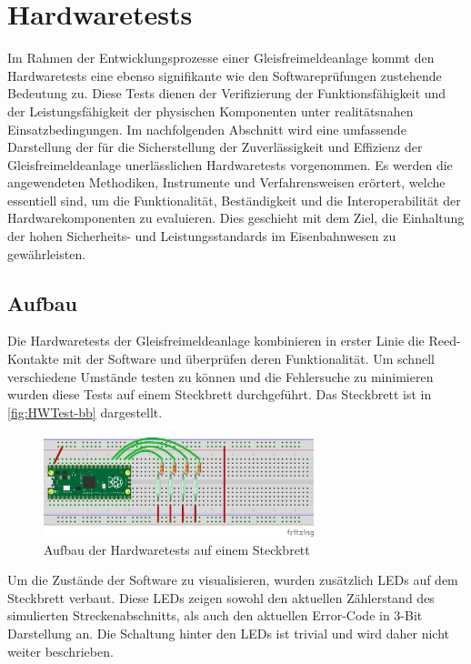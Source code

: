 \section{Hardwaretests}\label{text:Entwicklung-der-GFA:Hardwaretests}

Im Rahmen der Entwicklungsprozesse einer Gleisfreimeldeanlage kommt den Hardwaretests eine ebenso signifikante wie den Softwareprüfungen zustehende Bedeutung zu. Diese Tests dienen der Verifizierung der Funktionsfähigkeit und der Leistungsfähigkeit der physischen Komponenten unter realitätsnahen Einsatzbedingungen. Im nachfolgenden Abschnitt wird eine umfassende Darstellung der für die Sicherstellung der Zuverlässigkeit und Effizienz der Gleisfreimeldeanlage unerlässlichen Hardwaretests vorgenommen. Es werden die angewendeten Methodiken, Instrumente und Verfahrensweisen erörtert, welche essentiell sind, um die Funktionalität, Beständigkeit und die Interoperabilität der Hardwarekomponenten zu evaluieren. Dies geschieht mit dem Ziel, die Einhaltung der hohen Sicherheits- und Leistungsstandards im Eisenbahnwesen zu gewährleisten.

\subsection{Aufbau}

Die Hardwaretests der Gleisfreimeldeanlage kombinieren in erster Linie die Reed-Kontakte mit der Software und überprüfen deren Funktionalität. Um schnell verschiedene Umstände testen zu können und die Fehlersuche zu minimieren wurden diese Tests auf einem Steckbrett durchgeführt. Das Steckbrett ist in \autoref{fig:HWTest-bb} dargestellt.
\begin{figure}[H]
    \centering
    \includegraphics[width=0.7\textwidth]{Assets/Images/4-Entwicklung-der-GFA/Reed-Test_bb.png}
    \caption{Aufbau der Hardwaretests auf einem Steckbrett}
    \label{fig:HWTest-bb}
\end{figure}

Um die Zustände der Software zu visualisieren, wurden zusätzlich LEDs auf dem Steckbrett verbaut. Diese LEDs zeigen sowohl den aktuellen Zählerstand des simulierten Streckenabschnitts, als auch den aktuellen Error-Code in 3-Bit Darstellung an. Die Schaltung hinter den LEDs ist trivial und wird daher nicht weiter beschrieben.

